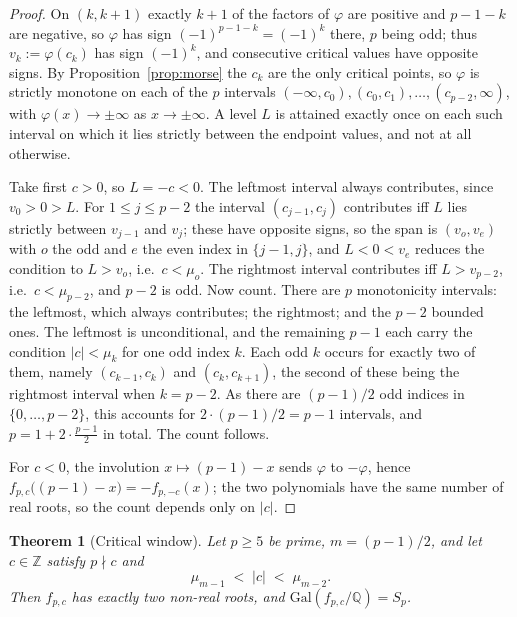 \documentclass[11pt,a4paper]{amsart}
\newcommand{\Q}{\mathbb{Q}}
\newcommand{\Z}{\mathbb{Z}}
\newcommand{\Gal}{\mathrm{Gal}}
\theoremstyle{plain}
\newtheorem{theorem}{Theorem}
\theoremstyle{definition}
\begin{document}
\begin{proof}
On \((k,k+1)\) exactly \(k+1\) of the factors of \(\varphi\) are positive and \(p-1-k\) are negative, so \(\varphi\) has sign \((-1)^{p-1-k}=(-1)^{k}\) there, \(p\) being odd; thus \(v_k:=\varphi(c_k)\) has sign \((-1)^k\), and consecutive critical values have opposite signs. By Proposition~\ref{prop:morse} the \(c_k\) are the only critical points, so \(\varphi\) is strictly monotone on each of the \(p\) intervals \((-\infty,c_0),(c_0,c_1),\dots,(c_{p-2},\infty)\), with \(\varphi(x)\to\pm\infty\) as \(x\to\pm\infty\). A level \(L\) is attained exactly once on each such interval on which it lies strictly between the endpoint values, and not at all otherwise.

Take first \(c>0\), so \(L=-c<0\). The leftmost interval always contributes, since \(v_0>0>L\). For \(1\le j\le p-2\) the interval \((c_{j-1},c_j)\) contributes iff \(L\) lies strictly between \(v_{j-1}\) and \(v_j\); these have opposite signs, so the span is \((v_{o},v_{e})\) with \(o\) the odd and \(e\) the even index in \(\{j-1,j\}\), and \(L<0<v_e\) reduces the condition to \(L>v_o\), i.e.\ \(c<\mu_o\). The rightmost interval contributes iff \(L>v_{p-2}\), i.e.\ \(c<\mu_{p-2}\), and \(p-2\) is odd. Now count. There are \(p\) monotonicity intervals: the leftmost, which always contributes; the rightmost; and the \(p-2\) bounded ones. The leftmost is unconditional, and the remaining \(p-1\) each carry the condition \(\lvert c\rvert<\mu_{k}\) for one odd index \(k\). Each odd \(k\) occurs for exactly two of them, namely \((c_{k-1},c_k)\) and \((c_k,c_{k+1})\), the second of these being the rightmost interval when \(k=p-2\). As there are \((p-1)/2\) odd indices in \(\{0,\dots,p-2\}\), this accounts for \(2\cdot(p-1)/2=p-1\) intervals, and \(p=1+2\cdot\frac{p-1}{2}\) in total. The count follows.

For \(c<0\), the involution \(x\mapsto(p-1)-x\) sends \(\varphi\) to \(-\varphi\), hence \(f_{p,c}\bigl((p-1)-x\bigr)=-f_{p,-c}(x)\); the two polynomials have the same number of real roots, so the count depends only on \(\lvert c\rvert\).
\end{proof}

\begin{theorem}[Critical window]
\label{thm:window}
Let \(p\ge5\) be prime, \(m=(p-1)/2\), and let \(c\in\Z\) satisfy \(p\nmid c\) and
\[
\mu_{m-1}\;<\;\lvert c\rvert\;<\;\mu_{m-2}.
\]
Then \(f_{p,c}\) has exactly two non-real roots, and \(\Gal(f_{p,c}/\Q)=S_p\).
\end{theorem}
\end{document}
